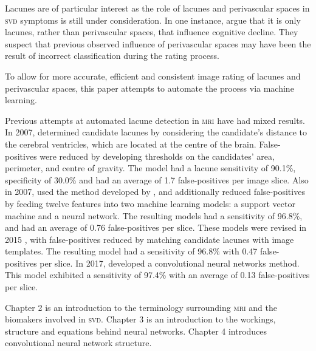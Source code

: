 Lacunes are of particular interest as the role of lacunes and perivascular spaces in \textsc{svd} symptoms is still under consideration. In one instance, \cite{BenjaminJ.Philip2018LIbN} argue that it is only lacunes, rather than perivascular spaces, that influence cognitive decline. They suspect that previous observed influence of perivascular spaces may have been the result of incorrect classification during the rating process.

To allow for more accurate, efficient and consistent image rating of lacunes and perivascular spaces, this paper attempts to automate the process via machine learning.

Previous attempts at automated lacune detection in \textsc{mri} have had mixed results. In 2007, \cite{Yokoyama2007} determined candidate lacunes by considering the candidate's distance to the cerebral ventricles, which are located at the centre of the brain. False-positives were reduced by developing thresholds on the candidates' area, perimeter, and centre of gravity. The model had a lacune sensitivity of 90.1\%, specificity of 30.0\% and had an average of 1.7 false-positives per image slice. Also in 2007, \cite{Uchiyama20071554, Uchiyama2007b} used the method developed by \cite{Yokoyama2007}, and additionally reduced false-positives by feeding twelve features into two machine learning models: a support vector machine and a neural network. The resulting models had a sensitivity of 96.8\%, and had an average of 0.76 false-positives per slice. These models were revised in 2015 \citep{Uchiyama2015}, with false-positives reduced by matching candidate lacunes with image templates. The resulting model had a sensitivity of 96.8\% with 0.47 false-positives per slice. In 2017, \cite{GhafoorianM.2017Dml3} developed a convolutional neural networks method. This model exhibited a sensitivity of 97.4\% with an average of 0.13 false-positives per slice.

Chapter 2 is an introduction to the terminology surrounding \textsc{mri} and the biomakers involved in \textsc{svd}. Chapter 3 is an introduction to the workings, structure and equations behind neural networks. Chapter 4 introduces convolutional neural network structure.

%
%
%





%